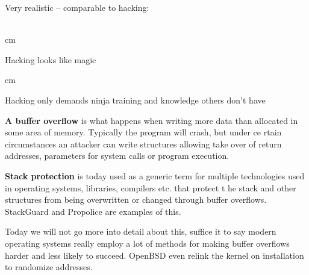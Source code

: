\documentclass[Screen16to9,17pt]{foils}
\begin{document}





Very realistic -- comparable to hacking:\\
\\





 cm

\centerline{Hacking looks like magic}




 cm
\centerline{Hacking only demands ninja training and knowledge others don't have}






\begin{list1}
\item {\bfseries A buffer overflow} is what happens when writing more data than allocated in some area of memory. Typically the program will crash, but under ce
rtain circumstances an attacker can write structures allowing take over of return addresses, parameters for system calls or program execution.
\item {\bfseries Stack protection} is today used as a generic term for multiple technologies used in operating systems, libraries, compilers etc. that protect t
he stack and other structures from being overwritten or changed through buffer overflows. StackGuard
and Propolice are examples of this.
\end{list1}

Today we will not go more into detail about this, suffice it to say modern operating systems really employ a lot of methods for making buffer overflows harder and less likely to succeed. OpenBSD even relink the kernel on installation to randomize addresses.


\end{document}
